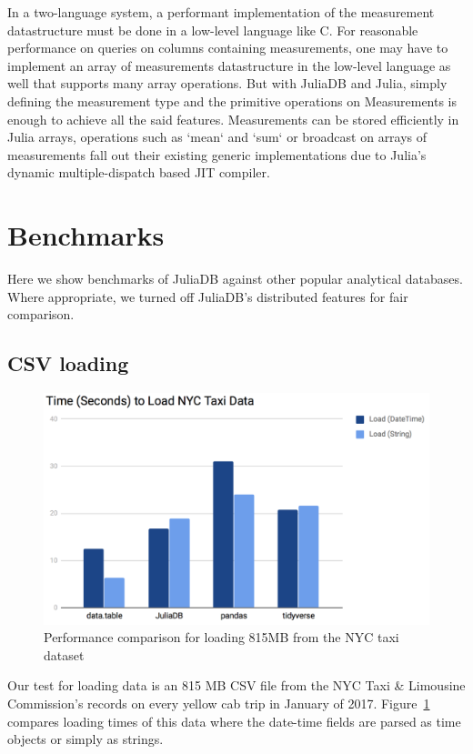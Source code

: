 \documentclass{juliacon}
\begin{document}
In a two-language system, a performant implementation of the measurement datastructure must be done in a low-level language like C. For reasonable performance on queries on columns containing measurements, one may have to implement an array of measurements datastructure in the low-level language as well that supports many array operations. But with JuliaDB and Julia, simply defining the measurement type and the primitive operations on Measurements is enough to achieve all the said features. Measurements can be stored efficiently in Julia arrays, operations such as `mean` and `sum` or broadcast on arrays of measurements fall out their existing generic implementations due to Julia's dynamic multiple-dispatch based JIT compiler.

\section{Benchmarks}

Here we show benchmarks of JuliaDB against other popular analytical
databases. Where appropriate, we turned off JuliaDB's distributed
features for fair comparison.

\subsection{CSV loading}

\begin{figure}[h]
\centering \includegraphics[width=5in]{image8.png} \caption{Performance comparison for loading 815MB from the NYC taxi dataset}
\label{fig:nyctaxiload} 
\end{figure}
Our test for loading data is an 815 MB CSV file from the NYC Taxi
\& Limousine Commission’s records on every yellow cab trip in January
of 2017. Figure~\ref{fig:nyctaxiload} compares loading times of
this data where the date-time fields are parsed as time objects or
simply as strings.
\end{document}
